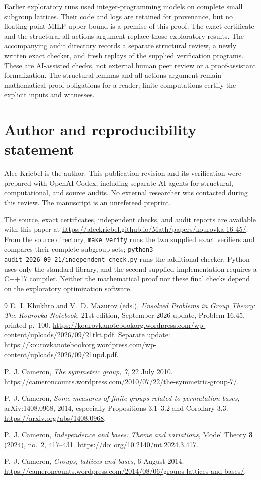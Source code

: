 \documentclass[11pt]{article}
\theoremstyle{remark}\newtheorem{remark}[theorem]{Remark}
\begin{document}
Earlier exploratory runs used integer-programming models on complete small
subgroup lattices. Their code and logs are retained for provenance, but no
floating-point MILP upper bound is a premise of this proof. The exact
certificate and the structural all-actions argument replace those exploratory
results. The accompanying audit directory records a separate structural review,
a newly written exact checker, and fresh replays of the supplied verification
programs. These are AI-assisted checks, not external human peer review or a
proof-assistant formalization. The structural lemmas and all-actions argument
remain mathematical proof obligations for a reader; finite computations
certify the explicit inputs and witnesses.

\section*{Author and reproducibility statement}
Alec Kriebel is the author. This publication revision and its verification
were prepared with OpenAI Codex, including separate AI agents for structural,
computational, and source audits. No external researcher was contacted during
this review. The manuscript is an unrefereed preprint.

The source, exact certificates, independent checks, and audit reports are
available with this paper at
\url{https://aleckriebel.github.io/Math/papers/kourovka-16-45/}.
From the source directory, \texttt{make verify} runs the two supplied exact
verifiers and compares their complete subgroup sets;
\texttt{python3 audit\_2026\_09\_21/independent\_check.py} runs the additional
checker. Python uses only the standard library, and the second supplied
implementation requires a C++17 compiler. Neither the mathematical proof nor
these final checks depend on the exploratory optimization software.

\clearpage
\begin{thebibliography}{9}
E.~I. Khukhro and V.~D. Mazurov (eds.),
\emph{Unsolved Problems in Group Theory: The Kourovka Notebook}, 21st edition,
September 2026 update, Problem 16.45, printed p.~100.
\url{https://kourovkanotebookorg.wordpress.com/wp-content/uploads/2026/09/21tkt.pdf}.
Separate update:
\url{https://kourovkanotebookorg.wordpress.com/wp-content/uploads/2026/09/21upd.pdf}.

P.~J. Cameron, \emph{The symmetric group, 7}, 22 July 2010.
\url{https://cameroncounts.wordpress.com/2010/07/22/the-symmetric-group-7/}.

P.~J. Cameron, \emph{Some measures of finite groups related to permutation
bases}, arXiv:1408.0968, 2014, especially Propositions 3.1--3.2 and
Corollary 3.3. \url{https://arxiv.org/abs/1408.0968}.

P.~J. Cameron, \emph{Independence and bases: Theme and variations},
Model Theory \textbf{3} (2024), no.~2, 417--431.
\url{https://doi.org/10.2140/mt.2024.3.417}.

P.~J. Cameron, \emph{Groups, lattices and bases}, 6 August 2014.
\url{https://cameroncounts.wordpress.com/2014/08/06/groups-lattices-and-bases/}.
\end{thebibliography}
\end{document}
